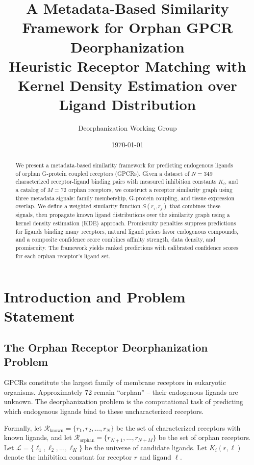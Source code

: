 \documentclass[12pt,oneside]{article}
\title{A Metadata-Based Similarity Framework for Orphan GPCR Deorphanization\\
\large Heuristic Receptor Matching with Kernel Density Estimation over Ligand Distribution}
\author{Deorphanization Working Group}
\date{\today}
\theoremstyle{definition}
\newcommand{\RR}{\mathcal{R}}
\newcommand{\LL}{\mathcal{L}}
\begin{document}
\maketitle

\begin{abstract}
We present a metadata-based similarity framework for predicting endogenous ligands of orphan G-protein coupled receptors (GPCRs). Given a dataset of $N = 349$ characterized receptor-ligand binding pairs with measured inhibition constants $K_i$, and a catalog of $M = 72$ orphan receptors, we construct a receptor similarity graph using three metadata signals: family membership, G-protein coupling, and tissue expression overlap. We define a weighted similarity function $S(r_i, r_j)$ that combines these signals, then propagate known ligand distributions over the similarity graph using a kernel density estimation (KDE) approach. Promiscuity penalties suppress predictions for ligands binding many receptors, natural ligand priors favor endogenous compounds, and a composite confidence score combines affinity strength, data density, and promiscuity. The framework yields ranked predictions with calibrated confidence scores for each orphan receptor's ligand set.
\end{abstract}

\tableofcontents

\section{Introduction and Problem Statement}

\subsection{The Orphan Receptor Deorphanization Problem}

GPCRs constitute the largest family of membrane receptors in eukaryotic organisms. Approximately 72 remain ``orphan'' -- their endogenous ligands are unknown. The deorphanization problem is the computational task of predicting which endogenous ligands bind to these uncharacterized receptors.

Formally, let $\RR_{\text{known}} = \{r_1, r_2, \ldots, r_N\}$ be the set of characterized receptors with known ligands, and let $\RR_{\text{orphan}} = \{r_{N+1}, \ldots, r_{N+M}\}$ be the set of orphan receptors. Let $\LL = \{\ell_1, \ell_2, \ldots, \ell_K\}$ be the universe of candidate ligands. Let $K_i(r, \ell)$ denote the inhibition constant for receptor $r$ and ligand $\ell$.
\end{document}
